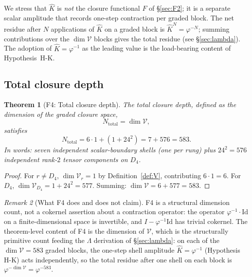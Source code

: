 \documentclass[12pt]{article}
\newtheorem{theorem}{Theorem}
\theoremstyle{definition}
\theoremstyle{remark}
\newtheorem{remark}[theorem]{Remark}
\newcommand{\Vcal}{\mathcal{V}}
\begin{document}
We stress that $\widehat{K}$ is \emph{not} the closure functional $F$ of \S\ref{sec:F2}; it is a separate scalar amplitude that records one-step contraction per graded block. The net residue after $N$ applications of $\widehat{K}$ on a graded block is $\widehat{K}^N = \varphi^{-N}$; summing contributions over the $\dim \Vcal$ blocks gives the total residue (see \S\ref{sec:lambda}). The adoption of $\widehat{K} = \varphi^{-1}$ as the leading value is the load-bearing content of Hypothesis~H-K.

\subsection{Total closure depth}

\begin{theorem}[F4: Total closure depth]\label{thm:F4}
The total closure depth, defined as the dimension of the graded closure space,
\begin{equation}
N_{\mathrm{total}} = \dim \Vcal,
\end{equation}
satisfies
\begin{equation}\label{eq:N-total}
N_{\mathrm{total}} = 6 \cdot 1 + (1 + 24^2) = 7 + 576 = 583.
\end{equation}
In words: seven independent scalar-boundary shells (one per rung) plus $24^2 = 576$ independent rank-$2$ tensor components on $D_4$.
\end{theorem}

\begin{proof}
For $r \ne D_4$, $\dim \Vcal_r = 1$ by Definition~\ref{def:V}, contributing $6 \cdot 1 = 6$. For $D_4$, $\dim \Vcal_{D_4} = 1 + 24^2 = 577$. Summing: $\dim \Vcal = 6 + 577 = 583$.
\end{proof}

\begin{remark}[What F4 does and does not claim]
F4 is a structural dimension count, not a cokernel assertion about a contraction operator: the operator $\varphi^{-1} \cdot \mathrm{Id}$ on a finite-dimensional space is invertible, and $I - \varphi^{-1} \mathrm{Id}$ has trivial cokernel. The theorem-level content of F4 is the dimension of $\Vcal$, which is the structurally primitive count feeding the $\Lambda$ derivation of \S\ref{sec:lambda}: on each of the $\dim \Vcal = 583$ graded blocks, the one-step shell amplitude $\widehat{K} = \varphi^{-1}$ (Hypothesis H-K) acts independently, so the total residue after one shell on each block is $\varphi^{-\dim \Vcal} = \varphi^{-583}$.
\end{remark}
\end{document}
